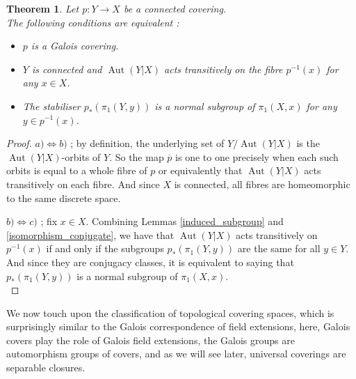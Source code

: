 \documentclass{article}
\theoremstyle{plain}
\newtheorem{theorem}{Theorem}[subsection]
\theoremstyle{definition}
\DeclareMathOperator{\Aut}{Aut}
\begin{document}
\begin{theorem}
\label{caracterize_Galois_cov}
    Let $p:Y\rightarrow X$ be a connected covering.\\
    The following conditions are equivalent :
    \begin{itemize}
        \item[$a)$] $p$ is a Galois covering.
        \item[$b)$] $Y$ is connected and $\Aut(Y|X)$ acts transitively on the fibre $p^{-1}(x)$ for any $x\in X$.
        \item[$c)$] The stabiliser $p_*(\pi_1(Y,y))$ is a normal subgroup of $\pi_1(X,x)$ for any $y\in p^{-1}(x)$.
    \end{itemize}
\end{theorem}
\begin{proof}
    $a) \Leftrightarrow b)$ ; 
    by definition, the underlying set of $Y/\Aut(Y|X)$ is the $\Aut(Y|X)$-orbits of $Y$. 
    So the map $\overline{p}$ is one to one precisely when each such orbits is equal to a whole fibre of $p$ or equivalently that $\Aut(Y|X)$ acts transitively on each fibre. 
    And since $X$ is connected, all fibres are homeomorphic to the same discrete space.

    $b) \Leftrightarrow c)$ ; fix $x\in X$.
    Combining Lemmas \ref{induced_subgroup} and \ref{isomorphism_conjugate}, we have that
    $\Aut(Y|X)$ acts transitively on $p^{-1}(x)$ if and only if the subgroups $p_*(\pi_1(Y,y))$ are the same for all $y\in Y$. And since they are conjugacy classes, it is equivalent to saying that $p_*(\pi_1(Y,y))$ is a normal subgroup of $\pi_1(X,x)$.\\
\end{proof}


\noindent We now touch upon the classification of topological covering spaces, which is surprisingly similar to the Galois correspondence of field extensions, here, Galois covers play the role of Galois field extensions, the Galois groups are automorphism groups of covers, and as we will see later, universal coverings are separable closures.

\end{document}
